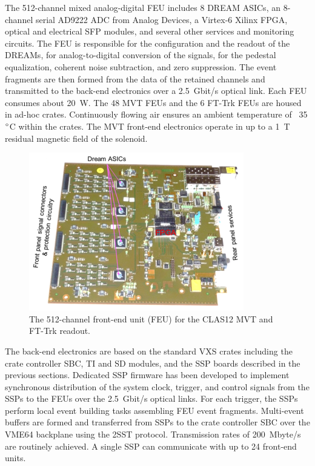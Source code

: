 The 512-channel mixed analog-digital FEU includes 8 DREAM ASICs, an 8-channel serial AD9222 ADC from Analog
Devices, a Virtex-6 Xilinx FPGA, optical and electrical SFP modules, and several other services and monitoring circuits.
The FEU is responsible for the configuration and the readout of the DREAMs, for analog-to-digital conversion of the
signals, for the pedestal equalization, coherent noise subtraction, and zero suppression. The event fragments are then
formed from the data of the retained channels and transmitted to the back-end electronics over a 2.5~Gbit/s optical link.
Each FEU consumes about 20~W. The 48 MVT FEUs and the 6 FT-Trk FEUs are housed in ad-hoc crates. Continuously
flowing air ensures an ambient temperature of ~35$\degree$C within the crates. The MVT front-end electronics operate
in up to a 1~T residual magnetic field of the solenoid.

\begin{figure}[hbt]
	\centering
	\includegraphics[width=1.0\columnwidth,keepaspectratio]{img/mvt2.png}
	\caption{The 512-channel front-end unit (FEU) for the CLAS12 MVT and FT-Trk readout.}
	\label{fig:mvt2}
\end{figure}

The back-end electronics are based on the standard VXS crates including the crate controller SBC, TI and SD modules,
and the SSP boards described in the previous sections. Dedicated SSP firmware has been developed to implement
synchronous distribution of the system clock, trigger, and control signals from the SSPs to the FEUs over the 2.5~Gbit/s
optical links. For each trigger, the SSPs perform local event building tasks assembling FEU event fragments. Multi-event
buffers are formed and transferred from SSPs to the crate controller SBC over the VME64 backplane using the 2SST
protocol. Transmission rates of 200~Mbyte/s are routinely achieved. A single SSP can communicate with up to 24 front-end
units.


